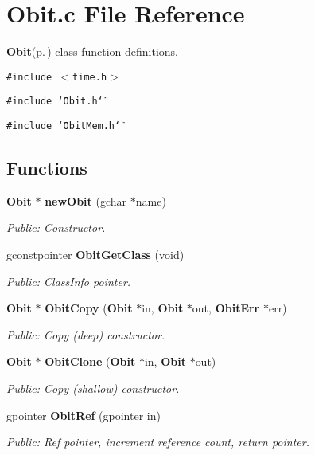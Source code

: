 \section{Obit.c File Reference}
\label{Obit_8c}
{\bf Obit}{\rm (p.\,\pageref{structObit})} class function definitions. 

{\tt \#include $<$time.h$>$}\par
{\tt \#include \char`\"{}Obit.h\char`\"{}}\par
{\tt \#include \char`\"{}Obit\-Mem.h\char`\"{}}\par
\subsection*{Functions}
\begin{CompactItemize}
\item 
{\bf Obit} $\ast$ {\bf new\-Obit} (gchar $\ast$name)
\begin{CompactList}\small\item\em Public: Constructor. \item\end{CompactList}\item 
gconstpointer {\bf Obit\-Get\-Class} (void)
\begin{CompactList}\small\item\em Public: Class\-Info pointer. \item\end{CompactList}\item 
{\bf Obit} $\ast$ {\bf Obit\-Copy} ({\bf Obit} $\ast$in, {\bf Obit} $\ast$out, {\bf Obit\-Err} $\ast$err)
\begin{CompactList}\small\item\em Public: Copy (deep) constructor. \item\end{CompactList}\item 
{\bf Obit} $\ast$ {\bf Obit\-Clone} ({\bf Obit} $\ast$in, {\bf Obit} $\ast$out)
\begin{CompactList}\small\item\em Public: Copy (shallow) constructor. \item\end{CompactList}\item 
gpointer {\bf Obit\-Ref} (gpointer in)
\begin{CompactList}\small\item\em Public: Ref pointer, increment reference count, return pointer. \item\end{CompactList}\item 

\end{CompactItemize}
